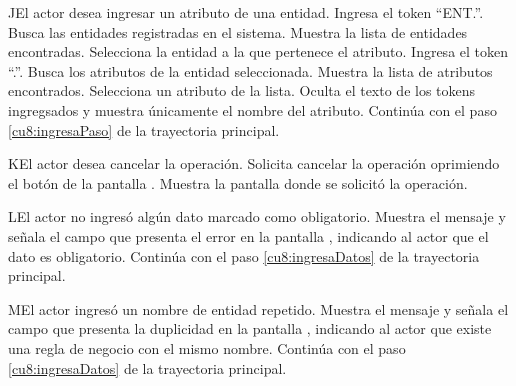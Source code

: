  \begin{UCtrayectoriaA}{J}{El actor desea ingresar un atributo de una entidad.}
 	\UCpaso[\UCactor] Ingresa el token ``ENT.''.
 	\UCpaso[\UCsist] Busca las entidades registradas en el sistema. 
 	\UCpaso[\UCsist] Muestra la lista de entidades encontradas.
 	\UCpaso[\UCactor] Selecciona la entidad a la que pertenece el atributo.
  	\UCpaso[\UCactor] Ingresa el token ``.''.
  	\UCpaso[\UCsist] Busca los atributos de la entidad seleccionada.
  	\UCpaso[\UCsist] Muestra la lista de atributos encontrados.
 	\UCpaso[\UCactor] Selecciona un atributo de la lista.
  	\UCpaso[\UCsist] Oculta el texto de los tokens ingregsados y muestra únicamente el nombre del atributo.
    \UCpaso[] Continúa con el paso \ref{cu8:ingresaPaso} de la trayectoria principal.
 \end{UCtrayectoriaA}
 \begin{UCtrayectoriaA}{K}{El actor desea cancelar la operación.}
    \UCpaso[\UCactor] Solicita cancelar la operación oprimiendo el botón  de la pantalla .
    \UCpaso[\UCsist] Muestra la pantalla donde se solicitó la operación.
 \end{UCtrayectoriaA}
 \begin{UCtrayectoriaA}{L}{El actor no ingresó algún dato marcado como obligatorio.}
    \UCpaso[\UCsist] Muestra el mensaje  y señala el campo que presenta el error en la pantalla 
	    , indicando al actor que el dato es obligatorio.
    \UCpaso[] Continúa con el paso \ref{cu8:ingresaDatos} de la trayectoria principal.
 \end{UCtrayectoriaA}
 \begin{UCtrayectoriaA}{M}{El actor ingresó un nombre de entidad repetido.}
    \UCpaso[\UCsist] Muestra el mensaje  y señala el campo que presenta la duplicidad en la pantalla 
	    , indicando al actor que existe una regla de negocio con el mismo nombre.
    \UCpaso[] Continúa con el paso \ref{cu8:ingresaDatos} de la trayectoria principal.
 \end{UCtrayectoriaA}
 
